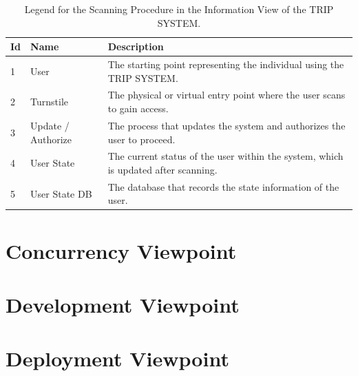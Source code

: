 \begin{table}[H]
    \centering
    \caption{Legend for the Scanning Procedure in the Information View of the TRIP SYSTEM.}
    \label{tab:scanning_procedure_legend}
    \begin{tabular}{@{}llp{10cm}@{}}
    \toprule
    \textbf{Id} & \textbf{Name} & \textbf{Description} \\
    \midrule
    1 & User & The starting point representing the individual using the TRIP SYSTEM. \\
    2 & Turnstile & The physical or virtual entry point where the user scans to gain access. \\
    3 & Update / Authorize & The process that updates the system and authorizes the user to proceed. \\
    4 & User State & The current status of the user within the system, which is updated after scanning. \\
    5 & User State DB & The database that records the state information of the user. \\
    \bottomrule
\end{tabular}
\end{table}

\section*{Concurrency Viewpoint}

\section*{Development Viewpoint}

\section*{Deployment Viewpoint}